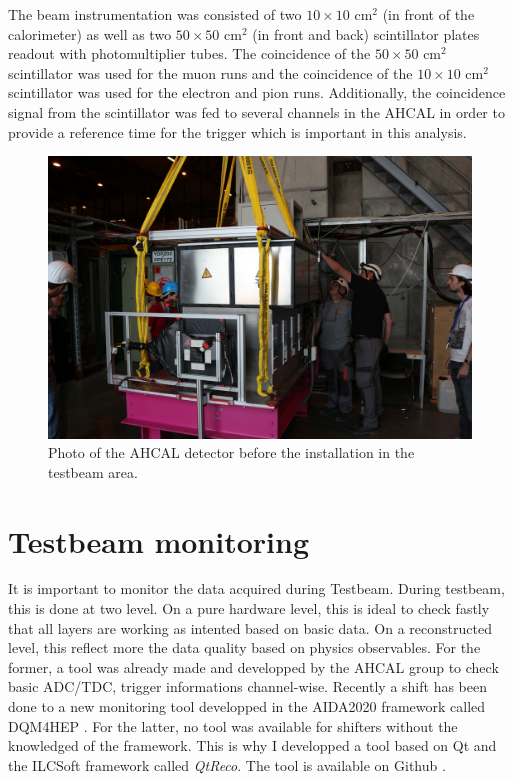 The beam instrumentation was consisted of two $10 \times 10$ cm$^2$ (in front of the calorimeter) as well as two $50 \times 50$ cm$^2$ (in front and back) scintillator plates readout with photomultiplier tubes. The coincidence of the $50 \times 50$ cm$^2$ scintillator was used for the muon runs and the coincidence of the $10 \times 10$ cm$^2$ scintillator was used for the electron and pion runs. Additionally, the coincidence signal from the scintillator was fed to several channels in the AHCAL in order to provide a reference time for the trigger which is important in this analysis.

\begin{figure}[htbp!]
	\centering
	\includegraphics[width=0.7\linewidth]{chap5/fig_EnergyCalib/IMG_1170.jpg}
	\caption{Photo of the AHCAL detector before the installation in the testbeam area.} \label{fig:AHCAL_photo}
\end{figure}

\section{Testbeam monitoring}

It is important to monitor the data acquired during Testbeam. During testbeam, this is done at two level. On a pure hardware level, this is ideal to check fastly that all layers are working as intented based on basic data. On a reconstructed level, this reflect more the data quality based on physics observables. For the former, a tool was already made and developped by the AHCAL group to check basic ADC/TDC, trigger informations channel-wise. Recently a shift has been done to a new monitoring tool developped in the AIDA2020 framework called DQM4HEP \cite{}. For the latter, no tool was available for shifters without the knowledged of the framework. This is why I developped a tool based on Qt and the ILCSoft framework called \textit{QtReco}. The tool is available on Github \cite{GithubTB}.

